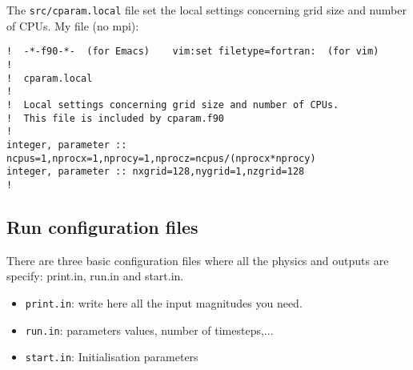 \documentclass[a4paper,12pt]{article}
\begin{document}
The \texttt{src/cparam.local} file set the local settings concerning grid size
and number of CPUs. My file (no mpi):
\begin{verbatim}
!  -*-f90-*-  (for Emacs)    vim:set filetype=fortran:  (for vim)
!
!  cparam.local
!
!  Local settings concerning grid size and number of CPUs.
!  This file is included by cparam.f90
!
integer, parameter :: ncpus=1,nprocx=1,nprocy=1,nprocz=ncpus/(nprocx*nprocy)
integer, parameter :: nxgrid=128,nygrid=1,nzgrid=128
!
\end{verbatim}

\subsection{Run configuration files}

There are three basic configuration files where all the physics and outputs are specify: print.in, run.in and start.in.
\begin{itemize}
  \item \verb|print.in|: write here all the input magnitudes you need.
  \item \verb|run.in|: parameters values, number of timesteps,...
  \item \verb|start.in|: Initialisation parameters
\end{itemize}



%
%

    
\end{document}

